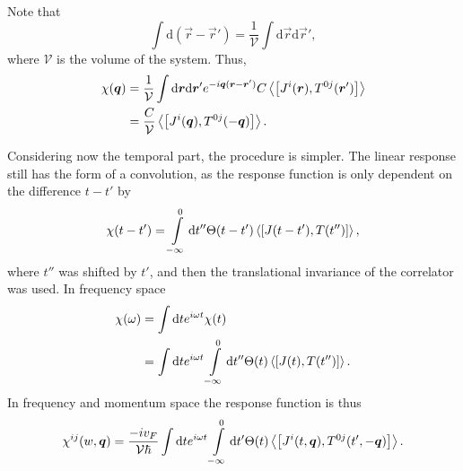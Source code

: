 Note that
\begin{equation}
  \int \mathrm{d}(\vec{r} - \vec{r}') = \frac{1}{\mathcal{V}} \int \mathrm{d}\vec{r} \mathrm{d} \vec{r}',
\end{equation}
where $\mathcal{V}$ is the volume of the system.
Thus,
\begin{equation}
  \begin{split}
    \chi (\vec{q}) &= \frac{1}{\mathcal{V}} \int \mathrm{d}\vec{r} \mathrm{d}\vec{r}'
    e^{-i\vec{q}(\vec{r}-\vec{r}')}
    C \Braket{\left[
        J^i(\vec{r}), T^{0j}(\vec{r}')
      \right]}\\
    &= \frac{C}{\mathcal{V}} \Braket{\left[ J^i(\vec{q}), T^{0j}(-\vec{q}) \right]}.
  \end{split}
\end{equation}

Considering now the temporal part, the procedure is simpler.
The linear response still has the form of a convolution, as the response function is only dependent on the difference $t-t'$ by
\begin{equation}
  \chi (t-t') = \int\limits_{-\infty }^0 \mathrm{d} t'' \Theta (t - t')
  \Braket{\left[ J(t-t'), T(t'') \right]},
\end{equation}
where $t''$ was shifted by $t' $, and then the translational invariance of the correlator was used.
In frequency space
\begin{align}
  \chi (\omega ) &= \int \mathrm{d} t e^{i \omega  t} \chi (t)\\
                 &= \int \mathrm{d} t e^{i \omega  t} \int\limits_{-\infty  }^0 \mathrm{d} t''
                   \Theta (t) \Braket{\left[ J(t), T(t'') \right]}.
\end{align}
In frequency and momentum space the response function is thus
\begin{equation}\label{eq:3}
  \chi ^{ij} (w, \vec{q}) =
  \frac{-iv_F}{\mathcal{V} \hbar } 
  \int \mathrm{d}t e^{i\omega t}
  \int\limits_{-\infty }^{0} \mathrm{d}t'
  \Theta (t)
  \Braket{\left[
      J^i(t, \vec{q}), T^{0j}(t', -\vec{q})
    \right]}.
\end{equation}

